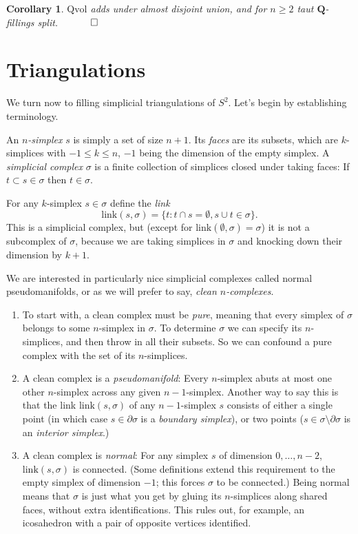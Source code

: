 \documentclass[12pt]{article}
\newtheorem{corollary}{Corollary}
\newcommand{\proofend}{$\quad \qed$}
\def\QQ{\mathbf{Q}}
\def\del{\partial}
\newcommand{\kw}{\mathrm}
\newcommand{\link}{\kw{link}}
\newcommand{\Qvol}{\kw{Qvol}}
\begin{document}
\begin{corollary} \label{cor1}
$\Qvol$ adds under almost disjoint union,
and for $n \geq 2$
taut $\QQ$-fillings split.
\proofend
\end{corollary}

\section{Triangulations}

We turn now to filling simplicial triangulations of $S^2$.
Let's begin by establishing terminology.

An \emph{$n$-simplex} $s$ is simply a set of size $n+1$.
Its \emph{faces} are its subsets,
which are $k$-simplices with $-1 \leq k \leq n$,
$-1$ being the dimension of the empty simplex.
A \emph{simplicial complex} $\sigma$ is a finite collection of simplices
closed under taking faces:
If $t \subset s \in \sigma$ then $t \in \sigma$.

For any $k$-simplex $s \in \sigma$ define the \emph{link}
\[
\link(s,\sigma) = \{t: t \cap s = \emptyset, s \cup t \in \sigma \}
.
\]
This is a simplicial complex, but
(except for $\link(\emptyset,\sigma)=\sigma$)
it is not a subcomplex of $\sigma$,
because we are taking simplices in $\sigma$ and knocking down
their dimension by $k+1$.

We are interested in particularly nice simplicial complexes
called normal pseudomanifolds, or as we will prefer to say,
\emph{clean $n$-complexes}.

\begin{enumerate}
\item
To start with,
a clean complex must be \emph{pure},
meaning that every simplex of $\sigma$ belongs to some $n$-simplex in $\sigma$.
To determine $\sigma$ we can specify its $n$-simplices,
and then throw in all their subsets.
So we can confound a pure complex with the set of its $n$-simplices.

\item
A clean complex is a \emph{pseudomanifold}:
Every $n$-simplex abuts at most one other $n$-simplex
across any given $n-1$-simplex.
Another way to say this is that
the link $\link(s,\sigma)$ of any $n-1$-simplex $s$
consists of either a single point 
(in which case $s \in \del \sigma$ is a \emph{boundary simplex}),
or two points
($s \in \sigma \setminus \del \sigma$ is an \emph{interior simplex}.)

\item
A clean complex is \emph{normal}:
For any simplex $s$ of dimension $0,\ldots,n-2$,
$\link(s,\sigma)$ is connected.
(Some definitions extend this requirement
to the empty simplex of dimension $-1$;
this forces $\sigma$ to be connected.)
Being normal means that $\sigma$ is just what you get by gluing its 
$n$-simplices along shared faces,
without extra identifications. This rules out, for example,
an icosahedron with a pair of opposite vertices identified.
\end{enumerate}
\end{document}

